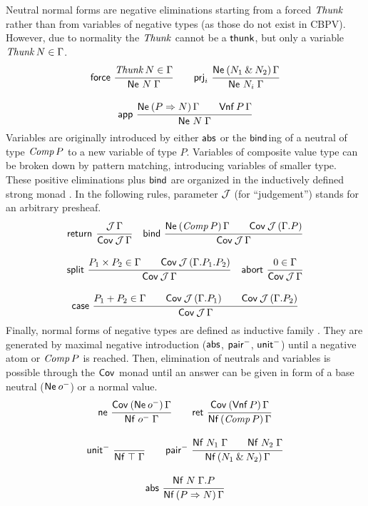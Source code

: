 \documentclass[sigconf,screen,fleqn]{acmart} %
\begin{document}
Neutral normal forms  are negative eliminations
starting from a forced $\mathit{Thunk}$ rather than from variables of negative
types (as those do not exist in CBPV).  However, due to normality
the $\mathit{Thunk}$ cannot be a $\mathsf{thunk}$, but only a variable
$\mathit{Thunk}\,N \in \Gamma$.
\begin{gather*}
  \nru{\tforce}{\Thunk N \in \Gamma}{\Ne N \Gamma}
\qquad
  \nru{\tprj_i}
      {\NeP {N_1 \ntimes N_2} \Gamma}
      {\Ne {N_i} \Gamma}
\\[2ex]
  \nru{\tapp}
      {\NeP {P \To N} \Gamma \qquad \PValNf P \Gamma}
      {\Ne N \Gamma}
\end{gather*}
Variables are originally introduced by either $\mathsf{abs}$ or
the $\mathsf{bind}$\-ing of a neutral of type $\mathit{Comp}\,P$ to a new variable of type
$P$.  Variables of composite value type can be broken down by pattern
matching, introducing variables of smaller type.  These positive
eliminations plus $\mathsf{bind}$ are organized in the
inductively defined strong monad \fbox{$\Cov$}.
In the following rules, parameter $\mathcal{J}$ (for ``judgement'') stands for an
arbitrary presheaf.
\begin{gather*}
  \nru{\treturn}{\J\,\Gamma}{\Cover \J \Gamma}
\quad
  \nru{\tbind}
      {\NeP {\Comp P} \Gamma \qquad \Cover \J (\cext \Gamma P)}
      {\Cover \J \Gamma}
\\[2ex]
  \nru{\tsplit}
      {P_1 \times P_2 \in \Gamma \qquad
       \Cover \J (\cext {\cext \Gamma {P_1}} {P_2})
      }
      {\Cover \J \Gamma}
\quad
  \nru{\tabort}
      {\tyempty \in \Gamma}
      {\Cover \J \Gamma}
\\[2ex]
  \nru{\tcase}
      {P_1 + P_2 \in \Gamma
       \qquad \Cover \J (\cext \Gamma {P_1})
       \qquad \Cover \J (\cext \Gamma {P_2})
      }
      {\Cover \J \Gamma}
\end{gather*}
Finally, normal forms of negative types are defined as inductive
family .  They are generated by maximal negative
introduction ($\mathsf{abs}$, $\mathsf{pair}^-$, $\mathsf{unit}^-$) until a negative atom or
$\mathit{Comp}\,P$ is reached.  Then, elimination of neutrals and variables is
possible through the $\Cov$ monad until an answer can be given in form
of a base neutral ($\mathsf{Ne}^{}\,o^-$) or a normal value.
\begin{gather*}
  \nru{\tne}
      {\CoverP {\tNe\,\natom} \Gamma}
      {\Nf {\natom} \Gamma}
\qquad
  \nru{\tret}
      {\CoverP {\tVNf\,P}  \Gamma}
      {\NfP {\Comp P} \Gamma}
\\[2ex]
  \nru{\nunit}{}{\Nf \top \Gamma}
\qquad
  \nru{\npair}
      {\Nf {N_1} \Gamma \qquad \Nf {N_2} \Gamma}
      {\NfP {N_1 \ntimes N_2} \Gamma}
\\[2ex]
  \nru{\tabs}
      {\Nf N {\cext \Gamma P}}
      {\NfP {P \To N} \Gamma}
\end{gather*}
\end{document}
